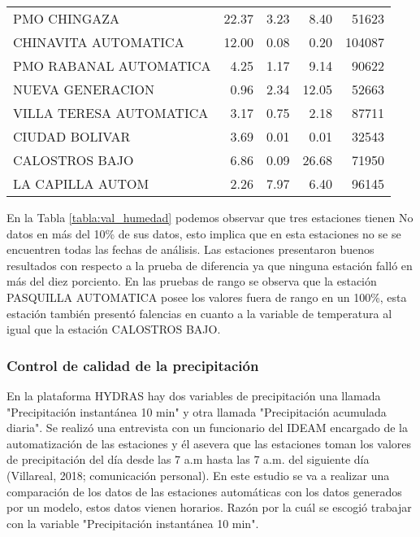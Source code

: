 \begin{table}[H]
\begin{center}
\begin{tabular}{p{5cm}rrrr}
            PMO CHINGAZA &     22.37 &           3.23 &      8.40 &         51623 \\
    CHINAVITA AUTOMATICA &     12.00 &           0.08 &      0.20 &        104087 \\
  PMO RABANAL AUTOMATICA &      4.25 &           1.17 &      9.14 &         90622 \\
        NUEVA GENERACION &      0.96 &           2.34 &     12.05 &         52663 \\
 VILLA TERESA AUTOMATICA &      3.17 &           0.75 &      2.18 &         87711 \\
          CIUDAD BOLIVAR &      3.69 &           0.01 &      0.01 &         32543 \\
          CALOSTROS BAJO &      6.86 &           0.09 &     26.68 &         71950 \\
        LA CAPILLA AUTOM &      2.26 &           7.97 &      6.40 &         96145 \\
\bottomrule
\end{tabular}
\end{center}
\end{table}

En la Tabla \ref{tabla:val_humedad} podemos observar que tres estaciones tienen No datos en más del 10\% de sus datos, esto implica que en esta estaciones no se se encuentren todas las fechas de análisis. Las estaciones presentaron buenos resultados con respecto a la prueba de diferencia ya que ninguna estación falló en más del diez porciento. En las pruebas de rango se observa que la estación PASQUILLA AUTOMATICA posee los valores fuera de rango en un 100\%, esta estación también presentó falencias en cuanto a la variable de temperatura al igual que la estación CALOSTROS BAJO.

\subsubsection{Control de calidad de la precipitación}

En la plataforma HYDRAS hay dos variables de precipitación una llamada "Precipitación instantánea 10 min" y otra llamada "Precipitación acumulada diaria". Se realizó una entrevista con un funcionario del IDEAM encargado de la automatización de las estaciones y él asevera que las estaciones toman los valores de precipitación del día desde las 7 a.m hasta las 7 a.m. del siguiente día (Villareal, 2018; comunicación personal). En este estudio se va a realizar una comparación de los datos de las estaciones automáticas con los datos generados por un modelo, estos datos vienen horarios. Razón por la cuál se escogió trabajar con la variable "Precipitación instantánea 10 min".


